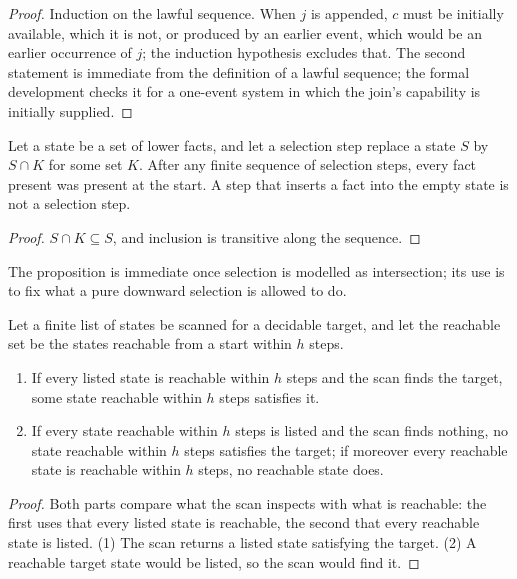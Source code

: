 \begin{proof}
Induction on the lawful sequence. When $j$ is appended, $c$ must be initially available, which
it is not, or produced by an earlier event, which would be an earlier occurrence of $j$; the
induction hypothesis excludes that. The second statement is immediate from the definition of a
lawful sequence; the formal development checks it for a one-event system in which the join's
capability is initially supplied.
\end{proof}

\begin{proposition}
\label{prop:selection}
Let a state be a set of lower facts, and let a selection step replace a state $S$ by
$S \cap K$ for some set $K$. After any finite sequence of selection steps, every fact present
was present at the start. A step that inserts a fact into the empty state is not a selection
step.
\end{proposition}

\begin{proof}
$S \cap K \subseteq S$, and inclusion is transitive along the sequence.
\end{proof}

The proposition is immediate once selection is modelled as intersection; its use is to fix what
a pure downward selection is allowed to do.

\begin{proposition}
\label{prop:search}
Let a finite list of states be scanned for a decidable target, and let the reachable set be the
states reachable from a start within $h$ steps.
\begin{enumerate}
  \item If every listed state is reachable within $h$ steps and the scan finds the target, some
        state reachable within $h$ steps satisfies it.
  \item If every state reachable within $h$ steps is listed and the scan finds nothing, no state
        reachable within $h$ steps satisfies the target; if moreover every reachable state is
        reachable within $h$ steps, no reachable state does.
\end{enumerate}
\end{proposition}

\begin{proof}
Both parts compare what the scan inspects with what is reachable: the first uses that every listed state is
reachable, the second that every reachable state is listed.
(1) The scan returns a listed state satisfying the target. (2) A reachable target state would
be listed, so the scan would find it.
\end{proof}

